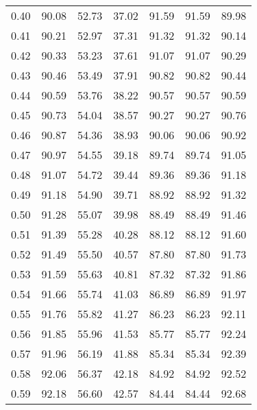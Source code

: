 \begin{tabular}{|c|c|c|c|c|c|c|}
      0.40 &     90.08 &     52.73 &      37.02 &   91.59 &      91.59 &         89.98 \\
      0.41 &     90.21 &     52.97 &      37.31 &   91.32 &      91.32 &         90.14 \\
      0.42 &     90.33 &     53.23 &      37.61 &   91.07 &      91.07 &         90.29 \\
      0.43 &     90.46 &     53.49 &      37.91 &   90.82 &      90.82 &         90.44 \\
      0.44 &     90.59 &     53.76 &      38.22 &   90.57 &      90.57 &         90.59 \\
      0.45 &     90.73 &     54.04 &      38.57 &   90.27 &      90.27 &         90.76 \\
      0.46 &     90.87 &     54.36 &      38.93 &   90.06 &      90.06 &         90.92 \\
      0.47 &     90.97 &     54.55 &      39.18 &   89.74 &      89.74 &         91.05 \\
      0.48 &     91.07 &     54.72 &      39.44 &   89.36 &      89.36 &         91.18 \\
      0.49 &     91.18 &     54.90 &      39.71 &   88.92 &      88.92 &         91.32 \\
      0.50 &     91.28 &     55.07 &      39.98 &   88.49 &      88.49 &         91.46 \\
      0.51 &     91.39 &     55.28 &      40.28 &   88.12 &      88.12 &         91.60 \\
      0.52 &     91.49 &     55.50 &      40.57 &   87.80 &      87.80 &         91.73 \\
      0.53 &     91.59 &     55.63 &      40.81 &   87.32 &      87.32 &         91.86 \\
      0.54 &     91.66 &     55.74 &      41.03 &   86.89 &      86.89 &         91.97 \\
      0.55 &     91.76 &     55.82 &      41.27 &   86.23 &      86.23 &         92.11 \\
      0.56 &     91.85 &     55.96 &      41.53 &   85.77 &      85.77 &         92.24 \\
      0.57 &     91.96 &     56.19 &      41.88 &   85.34 &      85.34 &         92.39 \\
      0.58 &     92.06 &     56.37 &      42.18 &   84.92 &      84.92 &         92.52 \\
      0.59 &     92.18 &     56.60 &      42.57 &   84.44 &      84.44 &         92.68 \\

\end{tabular}
